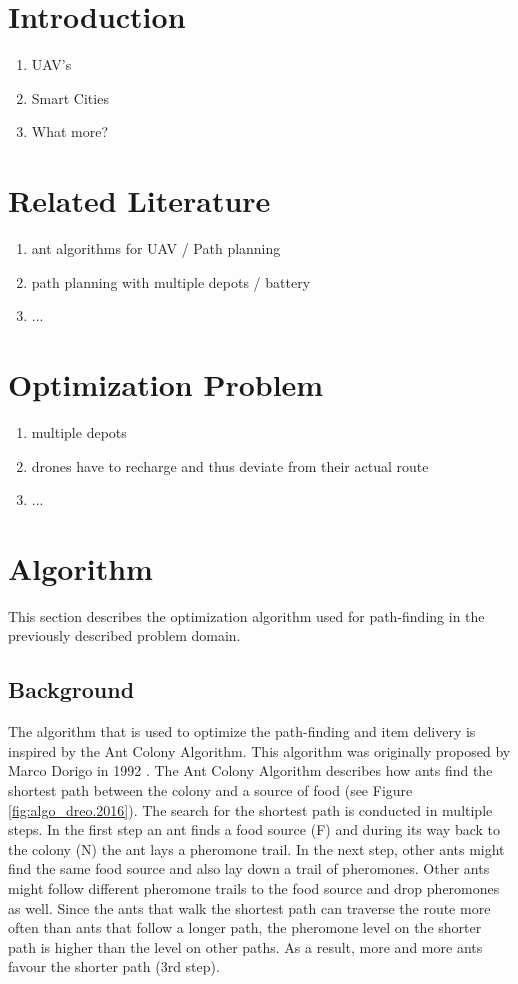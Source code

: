 \section{Introduction}
\begin{enumerate}
	\item UAV's
	\item Smart Cities
	\item What more?
\end{enumerate}

\section{Related Literature}
\begin{enumerate}
	\item ant algorithms for UAV / Path planning
	\item path planning with multiple depots / battery
	\item ...
\end{enumerate}

\section{Optimization Problem}
\begin{enumerate}
	\item multiple depots
	\item drones have to recharge and thus deviate from their actual route
	\item ...
	
\end{enumerate}

\section{Algorithm}
This section describes the optimization algorithm used for path-finding in the previously described problem domain.

\subsection{Background}
The algorithm that is used to optimize the path-finding and item delivery is inspired by the Ant Colony Algorithm. This algorithm was originally proposed by Marco Dorigo in 1992 \cite{dorigo.1992}. The Ant Colony Algorithm describes how ants find the shortest path between the colony and a source of food (see Figure \ref{fig:algo_dreo.2016}). The search for the shortest path is conducted in multiple steps. In the first step an ant finds a food source (F) and during its way back to the colony (N) the ant lays a pheromone trail. In the next step, other ants might find the same food source and also lay down a trail of pheromones. Other ants might follow different pheromone trails to the food source and drop pheromones as well. Since the ants that walk the shortest path can traverse the route more often than ants that follow a longer path, the pheromone level on the shorter path is higher than the level on other paths. As a result, more and more ants favour the shorter path (3rd step).

